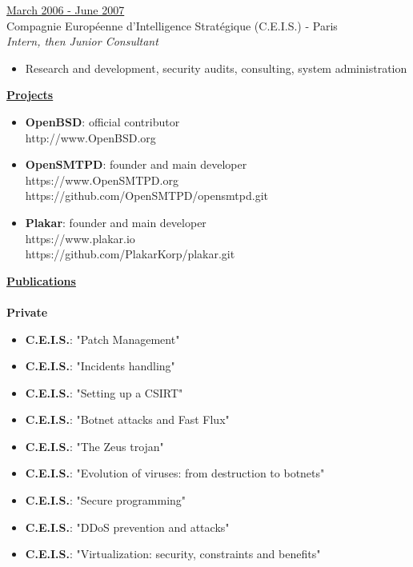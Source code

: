 \documentclass[a4paper,10pt]{letter}
\begin{document}
\begin{description}
\item{\underline{March 2006 - June 2007}} \\
  Compagnie Europ\'eenne d'Intelligence Strat\'egique (C.E.I.S.) - Paris\\
  \textit{Intern, then Junior Consultant}
  \begin{itemize}
  \item Research and development, security audits, consulting, system administration\\
  \end{itemize}
\end{description}

\pagebreak

\underline{\textbf{Projects}}\\
\begin{itemize}
\item	\textbf{OpenBSD}: official contributor\\
  http://www.OpenBSD.org\\
\item	\textbf{OpenSMTPD}: founder and main developer\\
  https://www.OpenSMTPD.org\\
  https://github.com/OpenSMTPD/opensmtpd.git\\
  \item	\textbf{Plakar}: founder and main developer\\
  https://www.plakar.io\\
  https://github.com/PlakarKorp/plakar.git\\
\end{itemize}

\underline{\textbf{Publications}}\\
\\
\textbf{Private}
\begin{itemize}
\item	\textbf{C.E.I.S.}: "Patch Management"
\item	\textbf{C.E.I.S.}: "Incidents handling"
\item	\textbf{C.E.I.S.}: "Setting up a CSIRT"
\item	\textbf{C.E.I.S.}: "Botnet attacks and Fast Flux"
\item	\textbf{C.E.I.S.}: "The Zeus trojan"
\item	\textbf{C.E.I.S.}: "Evolution of viruses: from destruction to botnets"
\item	\textbf{C.E.I.S.}: "Secure programming"
\item	\textbf{C.E.I.S.}: "DDoS prevention and attacks"
\item	\textbf{C.E.I.S.}: "Virtualization: security, constraints and benefits"\\
\end{itemize}
\end{document}

